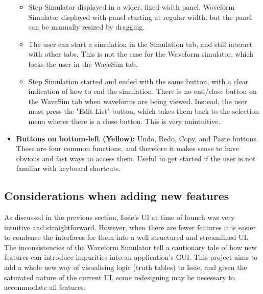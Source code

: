 \begin{itemize}
    \begin{itemize}
        \item Step Simulator displayed in a wider, fixed-width panel. Waveform Simulator displayed with panel starting at regular width, but the panel can be manually resized by dragging.
        \item The user can start a simulation in the Simulation tab, and still interact with other tabs. This is not the case for the Waveform simulator, which locks the user in the WaveSim tab.
        \item Step Simulation started and ended with the same button, with a clear indication of how to end the simulation. There is no end/close button on the WaveSim tab when waveforms are being viewed. Instead, the user must press the "Edit List" button, which takes them back to the selection menu wherer there is a close button. This is very unintuitive.
    \end{itemize}
    \item[] \textbf{Buttons on bottom-left (Yellow):} Undo, Redo, Copy, and Paste buttons. These are four common functions, and therefore it makes sense to have obvious and fast ways to access them. Useful to get started if the user is not familiar with keyboard shortcuts.
\end{itemize}

\subsection{Considerations when adding new features}
As discussed in the previous section, Issie's UI at time of launch was very intuitive and straightforward. However, when there are fewer features it is easier to condense the interfaces for them into a well structured and streamlined UI. The inconsistencies of the Waveform Simulator tell a cautionary tale of how new features can introduce impurities into an application's GUI. This project aims to add a whole new way of visualising logic (truth tables) to Issie, and given the saturated nature of the current UI, some redesigning may be necessary to accommodate all features.


